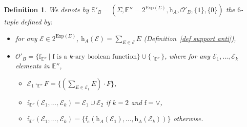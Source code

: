 \documentclass{article}
\newtheorem{definition}{Definition}
\begin{document}
    \begin{definition}\label{def support brzo aci}
      We denote by $\mathbb{S}'_B=(\Sigma,\mathbb{E}''=2^{\mathrm{Exp}(\Sigma)},\mathrm{h}_A,\mathcal{O}'_B,\{1\},\{0\})$ the $6$-tuple defined by:
    \begin{itemize}
      \item for any $\mathcal{E}\in 2^{\mathrm{Exp}(\Sigma)}$, $\mathrm{h}_A(\mathcal{E})=\sum_{E\in\mathcal{E}} E$ (Definition~\ref{def support anti}),
      \item $\mathcal{O}'_B=\{\mathrm{f}_{\mathbb{E}''}\mid \mathrm{f}\text{ is a } k\text{-ary boolean function}\}\cup\{\cdot_{\mathbb{E}''}\}$, where for any $\mathcal{E}_1,\ldots,\mathcal{E}_k$ elements in $\mathbb{E}''$,
      \begin{itemize}
        \item $\mathcal{E}_1 \cdot_{\mathbb{E}''} F=\{(\sum_{E\in\mathcal{E}_1} E)\cdot F\}$,
        \item $\mathrm{f}_{\mathbb{E}''}(\mathcal{E}_1,\ldots,\mathcal{E}_k)=\mathcal{E}_1\cup \mathcal{E}_2$ if $k=2$ and $\mathrm{f}=\vee$,
        \item $\mathrm{f}_{\mathbb{E}''}(\mathcal{E}_1,\ldots,\mathcal{E}_k)=\{\mathrm{f}_e(\mathrm{h}_A(\mathcal{E}_1),\ldots,\mathrm{h}_A(\mathcal{E}_k))\}$ otherwise.
      \end{itemize}
    \end{itemize}
    \end{definition}
    
\end{document}

